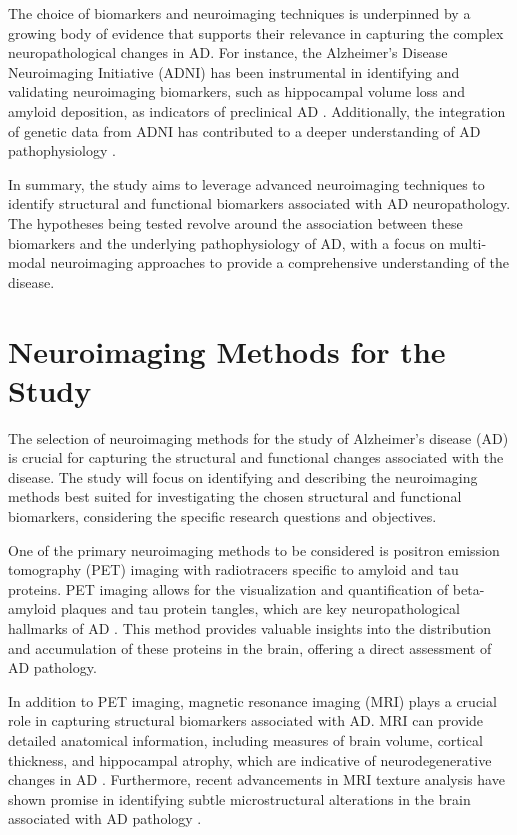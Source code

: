 \documentclass[10pt]{article}
\begin{document}
\begin{sloppypar}
  The choice of biomarkers and neuroimaging techniques is underpinned by a growing body of evidence that supports their relevance in capturing the complex neuropathological changes in AD. For instance, the Alzheimer's Disease Neuroimaging Initiative (ADNI) has been instrumental in identifying and validating neuroimaging biomarkers, such as hippocampal volume loss and amyloid deposition, as indicators of preclinical AD \citep{saykin_genetic_2015}. Additionally, the integration of genetic data from ADNI has contributed to a deeper understanding of AD pathophysiology \citep{saykin_genetic_2015}.

  In summary, the study aims to leverage advanced neuroimaging techniques to identify structural and functional biomarkers associated with AD neuropathology. The hypotheses being tested revolve around the association between these biomarkers and the underlying pathophysiology of AD, with a focus on multi-modal neuroimaging approaches to provide a comprehensive understanding of the disease.

  \section{Neuroimaging Methods for the Study}
  \label{sec:neuroimaging-methods}

  The selection of neuroimaging methods for the study of Alzheimer's disease (AD) is crucial for capturing the structural and functional changes associated with the disease. The study will focus on identifying and describing the neuroimaging methods best suited for investigating the chosen structural and functional biomarkers, considering the specific research questions and objectives.

  One of the primary neuroimaging methods to be considered is positron emission tomography (PET) imaging with radiotracers specific to amyloid and tau proteins. PET imaging allows for the visualization and quantification of beta-amyloid plaques and tau protein tangles, which are key neuropathological hallmarks of AD \citep{jack_serial_2009}. This method provides valuable insights into the distribution and accumulation of these proteins in the brain, offering a direct assessment of AD pathology.

  In addition to PET imaging, magnetic resonance imaging (MRI) plays a crucial role in capturing structural biomarkers associated with AD. MRI can provide detailed anatomical information, including measures of brain volume, cortical thickness, and hippocampal atrophy, which are indicative of neurodegenerative changes in AD \citep{cai_magnetic_2020}. Furthermore, recent advancements in MRI texture analysis have shown promise in identifying subtle microstructural alterations in the brain associated with AD pathology \citep{cai_magnetic_2020}.


\end{sloppypar}
\end{document}
